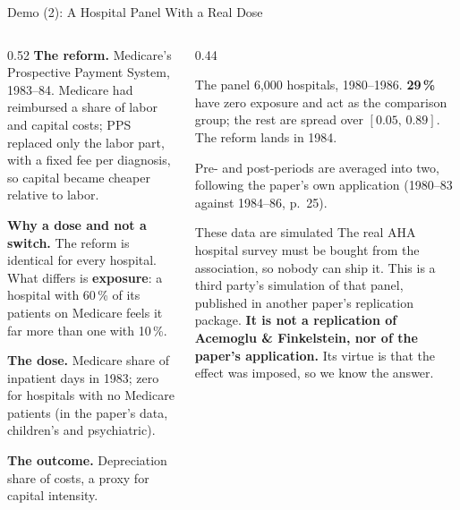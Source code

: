 \documentclass[main.tex]{subfiles}
\begin{document}
\begin{frame}{Demo (2): A Hospital Panel With a Real Dose}

  \begin{columns}[T]
    \begin{column}{0.52\textwidth}
      \textbf{The reform.} Medicare's Prospective Payment System, 1983--84.
      Medicare had reimbursed a share of labor and capital costs; PPS replaced
      only the labor part, with a fixed fee per diagnosis, so capital became
      cheaper relative to labor.

      \smallskip
      \textbf{Why a dose and not a switch.} The reform is identical for every
      hospital. What differs is \textbf{exposure}: a hospital with 60\,\% of its
      patients on Medicare feels it far more than one with 10\,\%.

      \smallskip
      \textbf{The dose.} Medicare share of inpatient days in 1983; zero for
      hospitals with no Medicare patients (in the paper's data, children's and
      psychiatric).

      \smallskip
      \textbf{The outcome.} Depreciation share of costs, a proxy for capital
      intensity.
    \end{column}
    \begin{column}{0.44\textwidth}
      \begin{block}{\footnotesize The panel}
        \footnotesize
        6{,}000 hospitals, 1980--1986. \textbf{29\,\%} have zero exposure and
        act as the comparison group; the rest are spread over
        $[0.05,\,0.89]$. The reform lands in 1984.

        \smallskip
        Pre- and post-periods are averaged into two, following the paper's own
        application (1980--83 against 1984--86, p.~25).
      \end{block}

      \smallskip
      \begin{alertblock}{\footnotesize These data are simulated}
        \footnotesize
        The real AHA hospital survey must be bought from the association, so
        nobody can ship it. This is a third party's simulation of that panel,
        published in another paper's replication package. \textbf{It is not a
        replication of Acemoglu \& Finkelstein, nor of the paper's application.}
        Its virtue is that the effect was imposed, so we know the answer.
      \end{alertblock}
    \end{column}
  \end{columns}

\end{frame}
\end{document}
